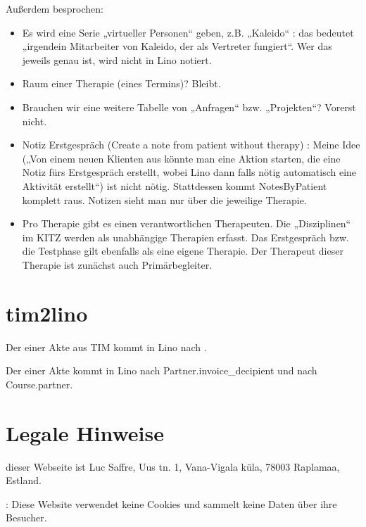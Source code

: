 \documentclass[letterpaper,10pt,ngerman]{sphinxmanual}
\begin{document}
Außerdem besprochen:
\begin{itemize}
\item {} 
Es wird eine Serie „virtueller Personen“ geben, z.B. „Kaleido“ : das
bedeutet „irgendein Mitarbeiter von Kaleido, der als Vertreter
fungiert“. Wer das jeweils genau ist, wird nicht in Lino notiert.

\item {} 
Raum einer Therapie (eines Termins)? Bleibt.

\item {} 
Brauchen wir eine weitere Tabelle von „Anfragen“ bzw. „Projekten“?
Vorerst nicht.

\item {} 
Notiz Erstgespräch (Create a note from patient without therapy) :
Meine Idee („Von einem neuen Klienten aus könnte man eine Aktion
starten, die eine Notiz fürs Erstgespräch erstellt, wobei Lino dann
falls nötig automatisch eine Aktivität erstellt“) ist nicht
nötig.  Stattdessen kommt NotesByPatient komplett raus. Notizen sieht
man nur über die jeweilige Therapie.

\item {} 
Pro Therapie gibt es einen verantwortlichen Therapeuten. Die
„Disziplinen“ im KITZ werden als unabhängige Therapien erfasst.  Das
Erstgespräch bzw. die Testphase gilt ebenfalls als eine eigene
Therapie.  Der Therapeut dieser Therapie ist zunächst auch
Primärbegleiter.

\end{itemize}


\chapter{tim2lino}
\label{\detokenize{tim2lino:tim2lino}}\label{\detokenize{tim2lino::doc}}
Der  einer Akte aus TIM kommt in Lino nach .

Der  einer Akte kommt in Lino nach Partner.invoice\_decipient
und nach Course.partner.


\chapter{Legale Hinweise}
\label{\detokenize{legal:legale-hinweise}}\label{\detokenize{legal::doc}}
 dieser Webseite ist Luc Saffre, Uus
tn. 1, Vana-Vigala küla, 78003 Raplamaa, Estland.

 : Diese Website verwendet keine Cookies und
sammelt keine Daten über ihre Besucher.



\renewcommand{\indexname}{Stichwortverzeichnis}
\printindex
\end{document}
